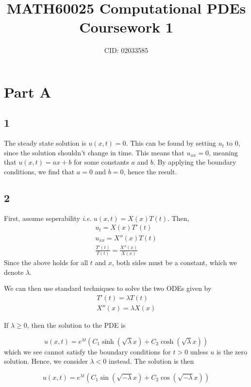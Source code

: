 \documentclass{article}
\title{MATH60025 Computational PDEs Coursework 1}
\author{
CID: 02033585
}
\date{}
\numberwithin{equation}{section}
\theoremstyle{definition}
\newcommand{\ie}{\textit{i}.\textit{e}. }
\begin{document}
\maketitle

\section{Part A}
\subsection{1}
The steady state solution is $u(x,t) = 0$. This can be found by setting $u_t$ to $0$, since the solution shouldn't change in time. This means that $u_{xx} = 0$, meaning that $u(x,t) = ax + b$ for some constants $a$ and $b$. By applying the boundary conditions, we find that $a = 0$ and $b = 0$, hence the result.

\subsection{2}

First, assume seperability \ie $u(x,t) = X(x)T(t)$. Then, 
\begin{align}
    u_t = X(x)T'(t) \\
    u_{xx} = X''(x)T(t) \\
    \frac{T'(t)}{T(t)} = \frac{X''(x)}{X(x)}
\end{align}
Since the above holds for all $t$ and $x$, both sides must be a constant, which we denote $\lambda$.

We can then use standard techniques to solve the two ODEs given by
\begin{align}
    T'(t) = \lambda T(t) \\
    X''(x) = \lambda X(x)
\end{align}

If $\lambda \geq 0$, then the solution to the PDE is 

\begin{equation}
    u(x,t) = e^{\lambda t} (C_1 \sinh(\sqrt{\lambda} x) + C_2 \cosh(\sqrt{\lambda} x))
\end{equation}
which we see cannot satisfy the boundary conditions for $t>0$ unless $u$ is the zero solution. Hence, we consider $\lambda < 0$ instead. The solution is then

\begin{equation}
    u(x,t) = e^{\lambda t} (C_1 \sin(\sqrt{-\lambda} x) + C_2 \cos(\sqrt{-\lambda} x))
\end{equation}
\end{document}
